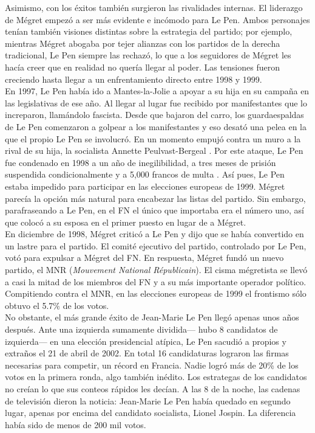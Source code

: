 Asimismo, con los éxitos también surgieron las rivalidades internas. El liderazgo de Mégret empezó a ser más evidente e incómodo para Le Pen. Ambos personajes tenían también visiones distintas sobre la estrategia del partido; por ejemplo, mientras Mégret abogaba por tejer alianzas con los partidos de la derecha tradicional, Le Pen siempre las rechazó, lo que a los seguidores de Mégret les hacía creer que en realidad no quería llegar al poder. Las tensiones fueron creciendo hasta llegar a un enfrentamiento directo entre 1998 y 1999.\\ 

En 1997, Le Pen había ido a Mantes-la-Jolie a apoyar a su hija en su campaña en las legislativas de ese año. Al llegar al lugar fue recibido por manifestantes que lo increparon, llamándolo fascista. Desde que bajaron del carro, los guardaespaldas de Le Pen comenzaron a golpear a los manifestantes y eso desató una pelea en la que el propio Le Pen se involucró. En un momento empujó contra un muro a la rival de su hija, la socialista Annette Peulvast-Bergeal \parencite{InaPolitique97}. Por este ataque, Le Pen fue condenado en 1998 a un año de inegilibilidad, a tres meses de prisión suspendida condicionalmente y a 5,000 francos de multa \parencite{LesEchos99}. Así pues, Le Pen estaba impedido para participar en las elecciones europeas de 1999. Mégret parecía la opción más natural para encabezar las listas del partido. Sin embargo, parafraseando a Le Pen, en el FN el único que importaba era el número uno, así que colocó a su esposa en el primer puesto en lugar de a Mégret.\\ 

En diciembre de 1998, Mégret criticó a Le Pen y dijo que se había convertido en un lastre para el partido. El comité ejecutivo del partido, controlado por Le Pen, votó para expulsar a Mégret del FN. En respuesta, Mégret fundó un nuevo partido, el MNR (\textit{Mouvement National Républicain}). El cisma mégretista se llevó a casi la mitad de los miembros del FN y a su más importante operador político. Compitiendo contra el MNR, en las elecciones europeas de 1999 el frontismo sólo obtuvo el 5.7\% de los votos.\\ 

No obstante, el más grande éxito de Jean-Marie Le Pen llegó apenas unos años después. Ante una izquierda sumamente dividida--- hubo 8 candidatos de izquierda--- en una elección presidencial atípica, Le Pen sacudió a propios y extraños el 21 de abril de 2002. En total 16 candidaturas lograron las firmas necesarias para competir, un récord en Francia. Nadie logró más de 20\% de los votos en la primera ronda, algo también inédito. Los estrategas de los candidatos no creían lo que sus conteos rápidos les decían. A las 8 de la noche, las cadenas de televisión dieron la noticia: Jean-Marie Le Pen había quedado en segundo lugar, apenas por encima del candidato socialista, Lionel Jospin. La diferencia había sido de menos de 200 mil votos.\\ 

